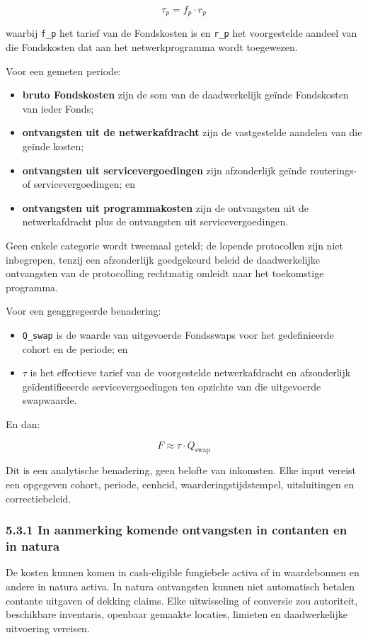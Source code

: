 \documentclass[11pt]{article}
\begin{document}
\[
\tau_p = f_p \cdot r_p
\]

waarbij \texttt{f\_p} het tarief van de Fondskosten is en \texttt{r\_p} het voorgestelde aandeel van die Fondskosten dat aan het netwerkprogramma wordt toegewezen.

Voor een gemeten periode:

\begin{itemize}[leftmargin=*]
\item \textbf{bruto Fondskosten} zijn de som van de daadwerkelijk geïnde Fondskosten van ieder Fonds;
\item \textbf{ontvangsten uit de netwerkafdracht} zijn de vastgestelde aandelen van die geïnde kosten;
\item \textbf{ontvangsten uit servicevergoedingen} zijn afzonderlijk geïnde routerings- of servicevergoedingen; en
\item \textbf{ontvangsten uit programmakosten} zijn de ontvangsten uit de netwerkafdracht plus de ontvangsten uit servicevergoedingen.
\end{itemize}
Geen enkele categorie wordt tweemaal geteld; de lopende protocollen zijn niet inbegrepen, tenzij een afzonderlijk goedgekeurd beleid de daadwerkelijke ontvangsten van de protocolling rechtmatig omleidt naar het toekomstige programma.

Voor een geaggregeerde benadering:

\begin{itemize}[leftmargin=*]
\item \texttt{Q\_swap} is de waarde van uitgevoerde Fondsswaps voor het gedefinieerde cohort en de periode; en
\item \texttt{$\tau$} is het effectieve tarief van de voorgestelde netwerkafdracht en afzonderlijk geïdentificeerde servicevergoedingen ten opzichte van die uitgevoerde swapwaarde.
\end{itemize}
En dan:

\[
F \approx \tau \cdot Q_{\mathrm{swap}}
\]

Dit is een analytische benadering, geen belofte van inkomsten. Elke input vereist een opgegeven cohort, periode, eenheid, waarderingstijdstempel, uitsluitingen en correctiebeleid.

\subsubsection*{5.3.1 In aanmerking komende ontvangsten in contanten en in natura}

De kosten kunnen komen in cash-eligible fungiebele activa of in waardebonnen en andere in natura activa. In natura ontvangsten kunnen niet automatisch betalen contante uitgaven of dekking claims. Elke uitwisseling of conversie zou autoriteit, beschikbare inventaris, openbaar gemaakte locaties, limieten en daadwerkelijke uitvoering vereisen.
\end{document}
